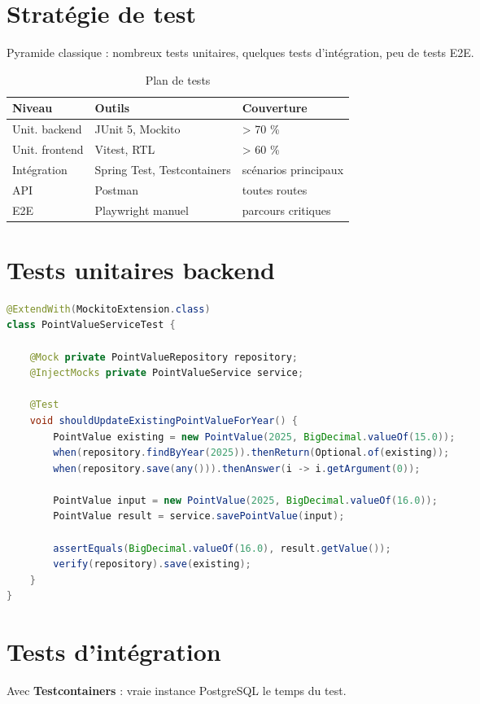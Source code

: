 \documentclass[12pt,a4paper,oneside]{report}
\begin{document}
\section{Stratégie de test}
Pyramide classique : nombreux tests unitaires, quelques tests d'intégration, peu de tests E2E.

\begin{table}[H]
\centering
\caption{Plan de tests}
\begin{tabular}{lll}
\toprule
\textbf{Niveau} & \textbf{Outils} & \textbf{Couverture} \\
\midrule
Unit. backend & JUnit 5, Mockito & \textgreater{} 70 \% \\
Unit. frontend & Vitest, RTL & \textgreater{} 60 \% \\
Intégration & Spring Test, Testcontainers & scénarios principaux \\
API & Postman & toutes routes \\
E2E & Playwright manuel & parcours critiques \\
\bottomrule
\end{tabular}
\end{table}

\section{Tests unitaires backend}

\begin{lstlisting}[language=Java,caption={Exemple de test unitaire}]
@ExtendWith(MockitoExtension.class)
class PointValueServiceTest {

    @Mock private PointValueRepository repository;
    @InjectMocks private PointValueService service;

    @Test
    void shouldUpdateExistingPointValueForYear() {
        PointValue existing = new PointValue(2025, BigDecimal.valueOf(15.0));
        when(repository.findByYear(2025)).thenReturn(Optional.of(existing));
        when(repository.save(any())).thenAnswer(i -> i.getArgument(0));

        PointValue input = new PointValue(2025, BigDecimal.valueOf(16.0));
        PointValue result = service.savePointValue(input);

        assertEquals(BigDecimal.valueOf(16.0), result.getValue());
        verify(repository).save(existing);
    }
}
\end{lstlisting}

\section{Tests d'intégration}
Avec \textbf{Testcontainers} : vraie instance PostgreSQL le temps du test.
\end{document}
